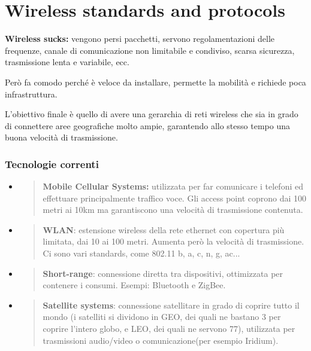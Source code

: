 \chapter{Wireless standards and protocols}
\label{wireless-standards-and-protocols}

\textbf{Wireless sucks:} vengono persi pacchetti, servono
regolamentazioni delle frequenze, canale di comunicazione non limitabile
e condiviso, scarsa sicurezza, trasmissione lenta e variabile, ecc.

Però fa comodo perché è veloce da installare, permette la mobilità e richiede 
poca infrastruttura.

L'obiettivo finale è quello di avere una gerarchia di reti wireless che sia in
grado di connettere aree geografiche molto ampie, garantendo allo stesso
tempo una buona velocità di trasmissione.

\subsection{Tecnologie correnti}\label{tecnologie-correnti}

\begin{itemize}
\item
  \begin{quote}
  \textbf{Mobile Cellular Systems:} utilizzata per far comunicare i
  telefoni ed effettuare principalmente traffico voce. Gli access point
  coprono dai 100 metri ai 10km ma garantiscono una velocità di
  trasmissione contenuta.
  \end{quote}
\item
  \begin{quote}
  \textbf{WLAN}: estensione wireless della rete ethernet con copertura
  più limitata, dai 10 ai 100 metri. Aumenta però la velocità di
  trasmissione. Ci sono vari standards, come 802.11 b, a, c, n, g, ac...
  \end{quote}
\item
  \begin{quote}
  \textbf{Short-range}: connessione diretta tra dispositivi, ottimizzata
  per contenere i consumi. Esempi: Bluetooth e ZigBee.
  \end{quote}
\item
  \begin{quote}
  \textbf{Satellite systems}: connessione satellitare in grado di
  coprire tutto il mondo (i satelliti si dividono in GEO, dei quali ne bastano 3
  per coprire l'intero globo, e LEO, dei quali ne servono 77), utilizzata per 
  trasmissioni audio/video o comunicazione(per esempio Iridium).
  \end{quote}
\end{itemize}

